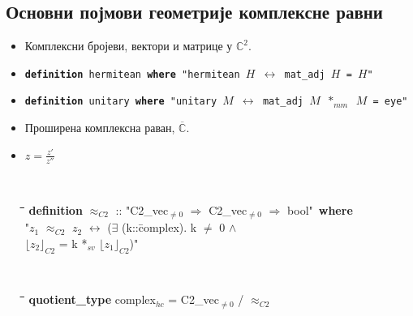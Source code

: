 \documentclass[slidestop, compress, mathserif, containsverbatim, xcolor=dvipsnames]{beamer}
\renewcommand{\C}[0]{\ensuremath{\mathbb{C}}}
\newcommand{\extC}[0]{\ensuremath{\overline{\C}}}
\newcommand{\Repnzv}[1]{\ensuremath{\lfloor#1\rfloor_{C2}}}
\newcommand{\approxhc}{\ensuremath{\approx_{C2}}}
\begin{document}
\subsection*{Основни појмови геометрије комплексне равни}

\begin{frame}{}
  \begin{itemize}
  \item Комплексни бројеви, вектори и матрице у $\mathbb{C}^2$. \vfill
  \item {} \begin{footnotesize} {\tt {\bf definition} hermitean {\bf where} "hermitean $H$ $\longleftrightarrow$ mat\_adj $H$ = $H$"\ } \end{footnotesize}  \vfill
  \item {} \begin{footnotesize} {\tt {\bf definition} unitary {\bf where} "unitary $M$ $\longleftrightarrow$ mat\_adj $M$ $*_{mm}$  $M$ = eye"\ } \end{footnotesize}  \vfill
  \item Проширена комплексна раван, $\extC$.  \vfill
  \item {} $z = \frac{z'}{z''}$
   \begin{footnotesize} {\tt
    \begin{tabbing}
      \hspace{5mm}\=\hspace{5mm}\=\hspace{5mm}\=\hspace{5mm}\=\hspace{5mm}\=\kill
      {\bf definition} $\approxhc$ :: "{}C2\_vec$_{\neq 0}$ $\Rightarrow$ C2\_vec$_{\neq 0}$ $\Rightarrow$ bool"\ {\bf where}\\
      \> "$z_1$ $\approxhc$ $z_2$ $\longleftrightarrow$ ($\exists$ (k::\=complex). k $\neq$ 0 $\wedge$ \\
      \>\> $\Repnzv{z_2}$ = k *$_{sv}$ $\Repnzv{z_1}$)"
    \end{tabbing}
  }
    {\tt
      \begin{tabbing}
        \hspace{5mm}\=\hspace{5mm}\=\hspace{5mm}\=\hspace{5mm}\=\hspace{5mm}\=\kill
        {\bf quotient\_type} complex$_{hc}$ = C2\_vec$_{\neq 0}$ / $\approxhc$
      \end{tabbing}
}
\end{footnotesize}
\end{itemize}
\end{frame}
\end{document}
